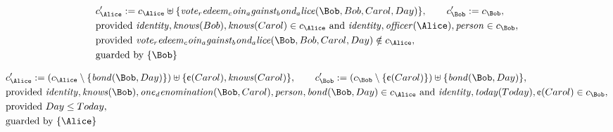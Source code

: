 \fi
\begin{align*}
&
c'_
{
\Alice
}
 := 
c_
{
\Alice
}
 \uplus 
\{
\mathit{
vote_redeem_coin_against_bond_alice
}
(
\Bob
,
Bob
,
Carol
,
Day
)
\}
, \qquad 
c'_
{
\Bob
}
 := 
c_
{
\Bob
}
,\\
&
\text{provided } 
\mathit{
identity
}
,
\mathit{
knows
}
(
Bob
)
,
\mathit{
knows
}
(
Carol
)
 \in c_
{
\Alice
}
 \text{ and } 
\mathit{
identity
}
,
\mathit{
officer
}
(
\Alice
)
,
\mathit{
person
}
 \in c_
{
\Bob
}
,\\
&
\text{provided } 
\mathit{
vote_redeem_coin_against_bond_alice
}
(
\Bob
,
Bob
,
Carol
,
Day
)
 \notin c_
{
\Alice
}
,\\
&
\text{guarded by } \{
\Bob
\}
\end{align*}

\begin{align*}
&
c'_
{
\Alice
}
 := 
(c_
{
\Alice
}
 \setminus 
\{
\mathit{
bond
}
(
\Bob
,
Day
)
\}
) \uplus 
\{
\text{\textcent}
(
Carol
)
,
\mathit{
knows
}
(
Carol
)
\}
, \qquad 
c'_
{
\Bob
}
 := 
(c_
{
\Bob
}
 \setminus 
\{
\text{\textcent}
(
Carol
)
\}
) \uplus 
\{
\mathit{
bond
}
(
\Bob
,
Day
)
\}
,\\
&
\text{provided } 
\mathit{
identity
}
,
\mathit{
knows
}
(
\Bob
)
,
\mathit{
one_denomination
}
(
\Bob
,
Carol
)
,
\mathit{
person
}
,
\mathit{
bond
}
(
\Bob
,
Day
)
 \in c_
{
\Alice
}
 \text{ and } 
\mathit{
identity
}
,
\mathit{
today
}
(
Today
)
,
\text{\textcent}
(
Carol
)
 \in c_
{
\Bob
}
,\\
&
\text{provided } 
Day
\le
Today
,\\
&
\text{guarded by } \{
\Alice
\}
\end{align*}

